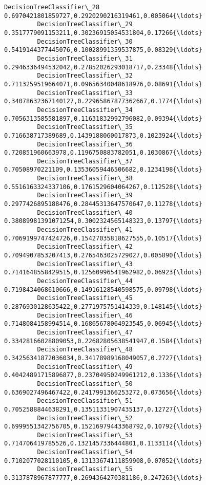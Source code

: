 \documentclass[11pt]{article}
\begin{document}
\begin{Verbatim}[commandchars=\\\{\}]
         DecisionTreeClassifier\_28   0.6970421801859727,0.2920290216319461,0.005064{\ldots}  
         DecisionTreeClassifier\_29   0.3517779091153211,0.30236915054531804,0.17266{\ldots}  
         DecisionTreeClassifier\_30   0.5419144377445076,0.10028991359537875,0.08329{\ldots}  
         DecisionTreeClassifier\_31   0.2946336494532042,0.27852026293018717,0.23348{\ldots}  
         DecisionTreeClassifier\_32   0.7113259519664071,0.09656340048618976,0.08691{\ldots}  
         DecisionTreeClassifier\_33   0.34078632367140127,0.22965867877362667,0.1774{\ldots}  
         DecisionTreeClassifier\_34   0.7056313585581897,0.11631832992796082,0.09394{\ldots}  
         DecisionTreeClassifier\_35   0.716638717389689,0.1439188060017873,0.1023924{\ldots}  
         DecisionTreeClassifier\_36   0.720851960663978,0.1196750883782051,0.1030867{\ldots}  
         DecisionTreeClassifier\_37   0.70508970221109,0.13536059446506682,0.1234198{\ldots}  
         DecisionTreeClassifier\_38   0.5516163324337106,0.1761529604064267,0.112528{\ldots}  
         DecisionTreeClassifier\_39   0.2977426895188476,0.28445313647570647,0.11278{\ldots}  
         DecisionTreeClassifier\_40   0.38089981391071254,0.3002324565148323,0.13797{\ldots}  
         DecisionTreeClassifier\_41   0.7069199747424726,0.15427035818627555,0.10517{\ldots}  
         DecisionTreeClassifier\_42   0.7094907853207413,0.2765463025729027,0.005890{\ldots}  
         DecisionTreeClassifier\_43   0.7141648558429515,0.12560996541962982,0.06923{\ldots}  
         DecisionTreeClassifier\_44   0.7198434068610666,0.14916128540598575,0.09798{\ldots}  
         DecisionTreeClassifier\_45   0.2876930128635422,0.2771975751414339,0.148145{\ldots}  
         DecisionTreeClassifier\_46   0.7148084158994514,0.16865678064923545,0.06945{\ldots}  
         DecisionTreeClassifier\_47   0.33428166028809053,0.22682805638541947,0.1584{\ldots}  
         DecisionTreeClassifier\_48   0.34256341872036034,0.34178989168049057,0.2727{\ldots}  
         DecisionTreeClassifier\_49   0.40424891715896877,0.23704950249961212,0.1336{\ldots}  
         DecisionTreeClassifier\_50   0.6369027496467422,0.2417991366253272,0.073656{\ldots}  
         DecisionTreeClassifier\_51   0.7052588844638291,0.13511331907435137,0.12727{\ldots}  
         DecisionTreeClassifier\_52   0.6999551342756705,0.15216979443368792,0.10792{\ldots}  
         DecisionTreeClassifier\_53   0.714706419785526,0.1321457336444801,0.1133114{\ldots}  
         DecisionTreeClassifier\_54   0.7102077028110105,0.13133674111859908,0.07052{\ldots}  
         DecisionTreeClassifier\_55   0.3137878967877777,0.2694364270381186,0.247263{\ldots}  

\end{Verbatim}
\end{document}

